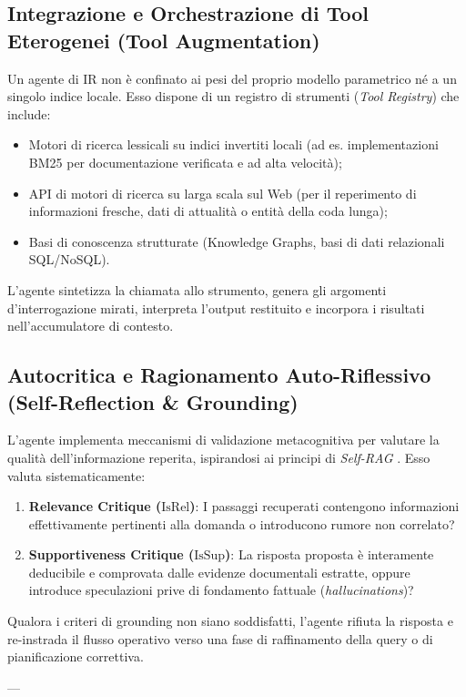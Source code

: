 \subsection{Integrazione e Orchestrazione di Tool Eterogenei (Tool Augmentation)}
Un agente di IR non è confinato ai pesi del proprio modello parametrico né a un singolo indice locale. Esso dispone di un registro di strumenti (\textit{Tool Registry}) che include:
\begin{itemize}
    \item Motori di ricerca lessicali su indici invertiti locali (ad es. implementazioni BM25 per documentazione verificata e ad alta velocità);
    \item API di motori di ricerca su larga scala sul Web (per il reperimento di informazioni fresche, dati di attualità o entità della coda lunga);
    \item Basi di conoscenza strutturate (Knowledge Graphs, basi di dati relazionali SQL/NoSQL).
\end{itemize}
L'agente sintetizza la chiamata allo strumento, genera gli argomenti d'interrogazione mirati, interpreta l'output restituito e incorpora i risultati nell'accumulatore di contesto.

\subsection{Autocritica e Ragionamento Auto-Riflessivo (Self-Reflection \& Grounding)}
L'agente implementa meccanismi di validazione metacognitiva per valutare la qualità dell'informazione reperita, ispirandosi ai principi di \textit{Self-RAG} \cite{asai2023selfrag}. Esso valuta sistematicamente:
\begin{enumerate}
    \item \textbf{Relevance Critique ($\text{IsRel}$)}: I passaggi recuperati contengono informazioni effettivamente pertinenti alla domanda o introducono rumore non correlato?
    \item \textbf{Supportiveness Critique ($\text{IsSup}$)}: La risposta proposta è interamente deducibile e comprovata dalle evidenze documentali estratte, oppure introduce speculazioni prive di fondamento fattuale (\textit{hallucinations})?
\end{enumerate}
Qualora i criteri di grounding non siano soddisfatti, l'agente rifiuta la risposta e re-instrada il flusso operativo verso una fase di raffinamento della query o di pianificazione correttiva.

---

